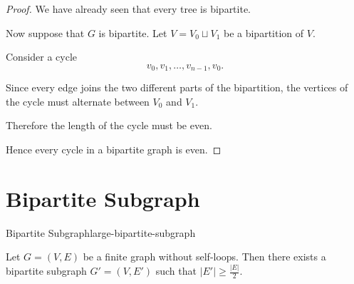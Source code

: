 \begin{proof}

We have already seen that every tree is bipartite.

Now suppose that $G$ is bipartite. Let
\(
V=V_0\sqcup V_1
\)
be a bipartition of $V$.

Consider a cycle
\[
v_0,v_1,\ldots,v_{n-1},v_0.
\]

Since every edge joins the two different parts of the bipartition,
the vertices of the cycle must alternate between $V_0$ and $V_1$.

Therefore the length of the cycle must be even.

Hence every cycle in a bipartite graph is even.

\end{proof}


\section{Bipartite Subgraph}

\begin{theorem}{Bipartite Subgraph}{large-bipartite-subgraph}

Let
\(
G=(V,E)
\)
be a finite graph without self-loops. Then there exists a bipartite
subgraph
\(
G'=(V,E')
\)
such that
\(
|E'|\geq\frac{|E|}{2}.
\)

\end{theorem}


